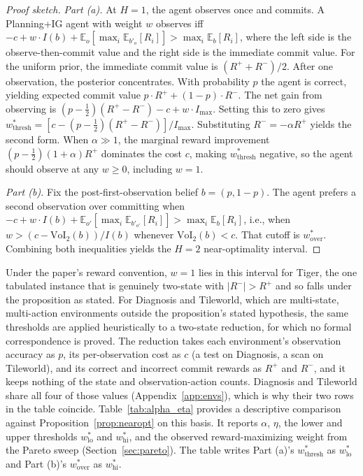 \begin{proof}[Proof sketch]
\emph{Part (a).} At $H{=}1$, the agent observes once and commits. A Planning+IG agent with weight $w$ observes iff $-c + w \cdot I(b) + \mathbb{E}_o[\max_i \mathbb{E}_{b'_o}[R_i]] > \max_i \mathbb{E}_b[R_i]$, where the left side is the observe-then-commit value and the right side is the immediate commit value. For the uniform prior, the immediate commit value is $(R^+ + R^-)/2$. After one observation, the posterior concentrates. With probability $p$ the agent is correct, yielding expected commit value $p \cdot R^+ + (1-p) \cdot R^-$. The net gain from observing is $(p - \frac{1}{2})(R^+ - R^-) - c + w \cdot I_{\max}$. Setting this to zero gives $w^*_{\mathrm{thresh}} = [c - (p-\frac{1}{2})(R^+ - R^-)]/I_{\max}$. Substituting $R^- = -\alpha R^+$ yields the second form. When $\alpha \gg 1$, the marginal reward improvement $(p - \frac{1}{2})(1 + \alpha)R^+$ dominates the cost $c$, making $w^*_{\mathrm{thresh}}$ negative, so the agent should observe at any $w \geq 0$, including $w{=}1$.

\emph{Part (b).} Fix the post-first-observation belief $b{=}(p,1{-}p)$. The agent prefers a second observation over committing when $-c + w \cdot I(b) + \mathbb{E}_{o'}[\max_i \mathbb{E}_{b'_{o'}}[R_i]] > \max_i \mathbb{E}_b[R_i]$, i.e., when $w > (c - \mathrm{VoI}_2(b))/I(b)$ whenever $\mathrm{VoI}_2(b) < c$. That cutoff is $w^*_{\mathrm{over}}$. Combining both inequalities yields the $H{=}2$ near-optimality interval.
\end{proof}

Under the paper's reward convention, $w{=}1$ lies in this interval for Tiger, the one tabulated instance that is genuinely two-state with $|R^-| > R^+$ and so falls under the proposition as stated. For Diagnosis and Tileworld, which are multi-state, multi-action environments outside the proposition's stated hypothesis, the same thresholds are applied heuristically to a two-state reduction, for which no formal correspondence is proved. The reduction takes each environment's observation accuracy as $p$, its per-observation cost as $c$ (a test on Diagnosis, a scan on Tileworld), and its correct and incorrect commit rewards as $R^+$ and $R^-$, and it keeps nothing of the state and observation-action counts. Diagnosis and Tileworld share all four of those values (Appendix~\ref{app:envs}), which is why their two rows in the table coincide. Table~\ref{tab:alpha_eta} provides a descriptive comparison against Proposition~\ref{prop:nearopt} on this basis. It reports $\alpha$, $\eta$, the lower and upper thresholds $w^*_{\mathrm{lo}}$ and $w^*_{\mathrm{hi}}$, and the observed reward-maximizing weight from the Pareto sweep (Section~\ref{sec:pareto}). The table writes Part (a)'s $w^*_{\mathrm{thresh}}$ as $w^*_{\mathrm{lo}}$ and Part (b)'s $w^*_{\mathrm{over}}$ as $w^*_{\mathrm{hi}}$.

